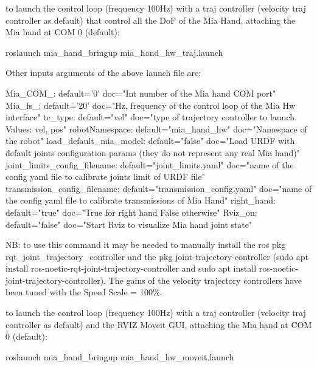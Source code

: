 \begin{DoxyItemize}
\item to launch the control loop (frequency 100Hz) with a traj controller (velocity traj controller as default) that control all the DoF of the Mia Hand, attaching the Mia hand at C\+OM 0 (default)\+: \begin{DoxyVerb}roslaunch mia_hand_bringup mia_hand_hw_traj.launch
\end{DoxyVerb}


Other inputs arguments of the above launch file are\+: \begin{DoxyVerb}Mia_COM_:                         default='0'                         doc="Int number of the Mia hand COM port"
Mia_fs_:                          default='20'                        doc="Hz, frequency of the control loop of the Mia Hw interface"
tc_type:                          default="vel"                       doc="type of trajectory controller to launch. Values: vel, pos"
robotNamespace:                   default="mia_hand_hw"               doc="Namespace of the robot"
load_default_mia_model:           default="false"                     doc="Load URDF with default joints configuration params (they do not represent any real Mia hand)"
joint_limits_config_filename:     default="joint_limits.yaml"         doc="name of the config yaml file to calibrate joints limit of URDF file"
transmission_config_filename:     default="transmission_config.yaml"  doc="name of the config yaml file to calibrate transmissions of Mia Hand"
right_hand:                       default="true"                      doc="True for right hand False otherwise"
Rviz_on:                          default="false"                     doc="Start Rviz to visualize Mia hand joint state"
\end{DoxyVerb}


NB\+: to use this command it may be needed to manually install the ros pkg rqt\+\_\+joint\+\_\+trajectory\+\_\+controller and the pkg joint-\/trajectory-\/controller (sudo apt install ros-\/noetic-\/rqt-\/joint-\/trajectory-\/controller and sudo apt install ros-\/noetic-\/joint-\/trajectory-\/controller). The gains of the velocity trajectory controllers have been tuned with the Speed Scale = 100\%.
\item to launch the control loop (frequency 100Hz) with a traj controller (velocity traj controller as default) and the R\+V\+IZ Moveit G\+UI, attaching the Mia hand at C\+OM 0 (default)\+: \begin{DoxyVerb}roslaunch mia_hand_bringup mia_hand_hw_moveit.launch
\end{DoxyVerb}



\end{DoxyItemize}

